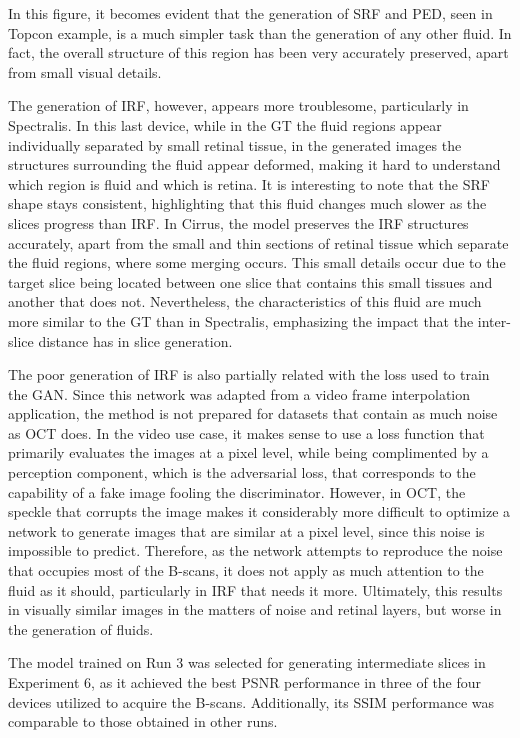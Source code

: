 In this figure, it becomes evident that the generation of SRF and PED, seen in Topcon example, is a much simpler task than the generation of any other fluid. In fact, the overall structure of this region has been very accurately preserved, apart from small visual details.
\par
The generation of IRF, however, appears more troublesome, particularly in Spectralis. In this last device, while in the GT the fluid regions appear individually separated by small retinal tissue, in the generated images the structures surrounding the fluid appear deformed, making it hard to understand which region is fluid and which is retina. It is interesting to note that the SRF shape stays consistent, highlighting that this fluid changes much slower as the slices progress than IRF. In Cirrus, the model preserves the IRF structures accurately, apart from the small and thin sections of retinal tissue which separate the fluid regions, where some merging occurs. This small details occur due to the target slice being located between one slice that contains this small tissues and another that does not. Nevertheless, the characteristics of this fluid are much more similar to the GT than in Spectralis, emphasizing the impact that the inter-slice distance has in slice generation.
\par
The poor generation of IRF is also partially related with the loss used to train the GAN. Since this network was adapted from a video frame interpolation application, the method is not prepared for datasets that contain as much noise as OCT does. In the video use case, it makes sense to use a loss function that primarily evaluates the images at a pixel level, while being complimented by a perception component, which is the adversarial loss, that corresponds to the capability of a fake image fooling the discriminator. However, in OCT, the speckle that corrupts the image makes it considerably more difficult to optimize a network to generate images that are similar at a pixel level, since this noise is impossible to predict. Therefore, as the network attempts to reproduce the noise that occupies most of the B-scans, it does not apply as much attention to the fluid as it should, particularly in IRF that needs it more. Ultimately, this results in visually similar images in the matters of noise and retinal layers, but worse in the generation of fluids.
\par
The model trained on Run 3 was selected for generating intermediate slices in Experiment 6, as it achieved the best PSNR performance in three of the four devices utilized to acquire the B-scans. Additionally, its SSIM performance was comparable to those obtained in other runs.

